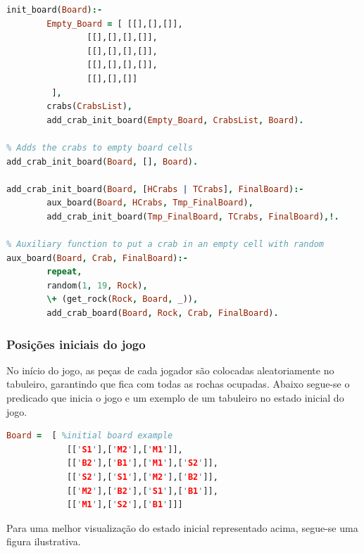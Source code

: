 \documentclass[a4paper]{article}
\begin{document}
\begin{lstlisting}[language=Prolog]
% Initializes Board
init_board(Board):-
        Empty_Board = [ [[],[],[]],
                [[],[],[],[]],
                [[],[],[],[]],
                [[],[],[],[]],
                [[],[],[]]
         ],
        crabs(CrabsList),
        add_crab_init_board(Empty_Board, CrabsList, Board).

% Adds the crabs to empty board cells 
add_crab_init_board(Board, [], Board).

add_crab_init_board(Board, [HCrabs | TCrabs], FinalBoard):-
        aux_board(Board, HCrabs, Tmp_FinalBoard),
        add_crab_init_board(Tmp_FinalBoard, TCrabs, FinalBoard),!.

% Auxiliary function to put a crab in an empty cell with random
aux_board(Board, Crab, FinalBoard):-
        repeat,
        random(1, 19, Rock),
        \+ (get_rock(Rock, Board, _)),
        add_crab_board(Board, Rock, Crab, FinalBoard).

\end{lstlisting}

\subsubsection{Posições iniciais do jogo}

No início do jogo, as peças de cada jogador são colocadas aleatoriamente no tabuleiro, garantindo que fica com todas as rochas ocupadas. Abaixo segue-se o predicado que inicia o jogo e um exemplo de um tabuleiro no estado inicial do jogo.
\begin{lstlisting}[language=Prolog]
Board =  [ %initial board example
    	 	[['S1'],['M2'],['M1']],
         	[['B2'],['B1'],['M1'],['S2']],
         	[['S2'],['S1'],['M2'],['B2']],
    	 	[['M2'],['B2'],['S1'],['B1']],
    	 	[['M1'],['S2'],['B1']]]   
\end{lstlisting}

Para uma melhor visualização do estado inicial representado acima, segue-se uma figura ilustrativa.
\end{document}
